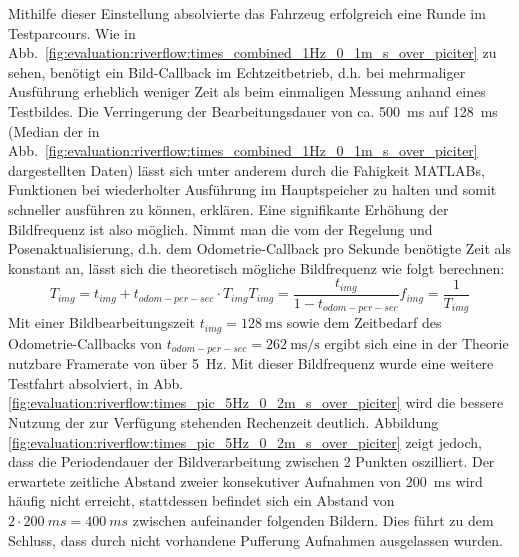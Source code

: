 Mithilfe dieser Einstellung absolvierte das Fahrzeug erfolgreich eine Runde im Testparcours. Wie in Abb.~\ref{fig:evaluation:riverflow:times_combined_1Hz_0_1m_s_over_piciter} zu sehen, benötigt ein Bild-Callback im Echtzeitbetrieb, d.h. bei mehrmaliger Ausführung erheblich weniger Zeit als beim einmaligen Messung anhand eines Testbildes. Die Verringerung der Bearbeitungsdauer  von ca. \SI{500}{\milli\second} auf \SI{128}{\milli\second} (Median der in Abb.~\ref{fig:evaluation:riverflow:times_combined_1Hz_0_1m_s_over_piciter} dargestellten Daten) lässt sich unter anderem durch die Fahigkeit MATLABs, Funktionen bei wiederholter Ausführung im Hauptspeicher zu halten und somit schneller ausführen zu können, erklären. Eine signifikante Erhöhung der Bildfrequenz  ist also möglich. Nimmt man die vom der Regelung und Posenaktualisierung, d.h. dem Odometrie-Callback  pro Sekunde benötigte Zeit  als konstant an, lässt sich die theoretisch mögliche Bildfrequenz wie folgt berechnen:
\begin{subequations}
\begin{equation}
	T_{img} = t_{img}+t_{odom-per-sec}\cdot T_{img}
\end{equation}
\begin{equation}
	T_{img} = \frac{t_{img}}{1-t_{odom-per-sec}}
\end{equation}
\begin{equation}	
	f_{img} = \frac{1}{T_{img}}
\end{equation}
\end{subequations} 
Mit einer Bildbearbeitungszeit \(t_{img}=\SI{128}{\milli\second}\) sowie dem Zeitbedarf des Odometrie-Callbacks von \(t_{odom-per-sec}=\SI{262}{\milli\second\per\second}\) ergibt sich eine in der Theorie nutzbare Framerate von über \SI{5}{\hertz}. Mit dieser Bildfrequenz wurde eine weitere Testfahrt absolviert, in Abb. \ref{fig:evaluation:riverflow:times_pic_5Hz_0_2m_s_over_piciter} wird die bessere Nutzung der zur Verfügung stehenden Rechenzeit deutlich. Abbildung \ref{fig:evaluation:riverflow:times_pic_5Hz_0_2m_s_over_piciter} zeigt jedoch, dass die Periodendauer der Bildverarbeitung zwischen 2 Punkten oszilliert. Der erwartete zeitliche Abstand zweier konsekutiver Aufnahmen von \SI{200}{ms} wird häufig nicht erreicht, stattdessen befindet sich ein Abstand von \(2 \cdot \SI{200}{ms} = \SI{400}{ms}\) zwischen aufeinander folgenden Bildern. Dies führt zu dem Schluss, dass durch nicht vorhandene Pufferung Aufnahmen ausgelassen wurden.

